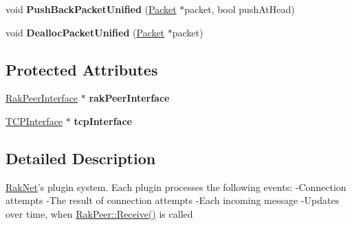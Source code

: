\begin{DoxyCompactItemize}
\item 
\hypertarget{class_rak_net_1_1_plugin_interface2_ac982c2b31c984312199e90db24652bf5}{void {\bfseries Push\-Back\-Packet\-Unified} (\hyperlink{struct_rak_net_1_1_packet}{Packet} $\ast$packet, bool push\-At\-Head)}\label{class_rak_net_1_1_plugin_interface2_ac982c2b31c984312199e90db24652bf5}

\item 
\hypertarget{class_rak_net_1_1_plugin_interface2_a256cbc0dfe8c8c1977716a46ec2ca465}{void {\bfseries Dealloc\-Packet\-Unified} (\hyperlink{struct_rak_net_1_1_packet}{Packet} $\ast$packet)}\label{class_rak_net_1_1_plugin_interface2_a256cbc0dfe8c8c1977716a46ec2ca465}

\end{DoxyCompactItemize}
\subsection*{Protected Attributes}
\begin{DoxyCompactItemize}
\item 
\hypertarget{class_rak_net_1_1_plugin_interface2_a4a4e170ed7239903306450ef425de4c0}{\hyperlink{class_rak_net_1_1_rak_peer_interface}{Rak\-Peer\-Interface} $\ast$ {\bfseries rak\-Peer\-Interface}}\label{class_rak_net_1_1_plugin_interface2_a4a4e170ed7239903306450ef425de4c0}

\item 
\hypertarget{class_rak_net_1_1_plugin_interface2_a499bcc612937a4e8bc1e76bb9f2b6a3d}{\hyperlink{class_rak_net_1_1_t_c_p_interface}{T\-C\-P\-Interface} $\ast$ {\bfseries tcp\-Interface}}\label{class_rak_net_1_1_plugin_interface2_a499bcc612937a4e8bc1e76bb9f2b6a3d}

\end{DoxyCompactItemize}


\subsection{Detailed Description}
\hyperlink{namespace_rak_net}{Rak\-Net}'s plugin system. Each plugin processes the following events\-: -\/\-Connection attempts -\/\-The result of connection attempts -\/\-Each incoming message -\/\-Updates over time, when \hyperlink{class_rak_net_1_1_rak_peer_a46d90fb903e747f76d63eb3a96543740}{Rak\-Peer\-::\-Receive()} is called 


